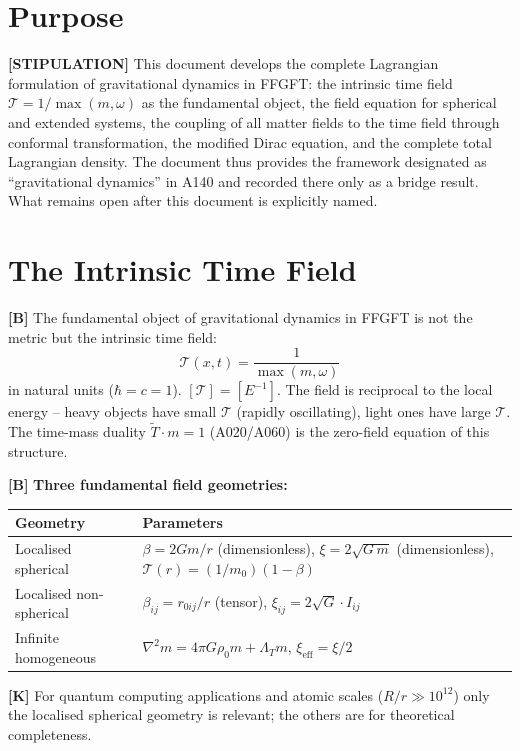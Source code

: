 \section{Purpose}

\textbf{[STIPULATION]} This document develops the complete Lagrangian formulation
of gravitational dynamics in FFGFT: the intrinsic time field
$\mathcal T=1/\max(m,\omega)$ as the fundamental object, the field equation for
spherical and extended systems, the coupling of all matter fields to the time
field through conformal transformation, the modified Dirac equation, and the
complete total Lagrangian density. The document thus provides the framework
designated as ``gravitational dynamics'' in A140 and recorded there only as a
bridge result. What remains open after this document is explicitly named.

\section{The Intrinsic Time Field}

\textbf{[B]} The fundamental object of gravitational dynamics in FFGFT is not the
metric but the intrinsic time field:
\[
  \boxed{\;\mathcal T(x,t) = \frac{1}{\max(m,\omega)}\;}
\]
in natural units ($\hbar=c=1$). $[\mathcal T]=[E^{-1}]$. The field is reciprocal
to the local energy -- heavy objects have small $\mathcal T$ (rapidly oscillating),
light ones have large $\mathcal T$. The time-mass duality $\tilde T\cdot m=1$
(A020/A060) is the zero-field equation of this structure.

\textbf{[B]} \textbf{Three fundamental field geometries:}

\begin{center}
\renewcommand{\arraystretch}{1.3}
{\small
\begin{tabular}{ll}
\toprule
Geometry & Parameters \\
\midrule
Localised spherical &
  $\beta=2Gm/r$ (dimensionless), $\xi=2\sqrt{G\,m}$ (dimensionless),
  $\mathcal T(r)=(1/m_0)(1-\beta)$ \\
Localised non-spherical &
  $\beta_{ij}=r_{0ij}/r$ (tensor), $\xi_{ij}=2\sqrt G\cdot I_{ij}$ \\
Infinite homogeneous &
  $\nabla^2 m=4\pi G\rho_0 m+\Lambda_T m$, $\xi_\text{eff}=\xi/2$ \\
\bottomrule
\end{tabular}
}
\renewcommand{\arraystretch}{1.0}
\end{center}

\textbf{[K]} For quantum computing applications and atomic scales
($R/r\gg10^{12}$) only the localised spherical geometry is relevant; the others
are for theoretical completeness.

